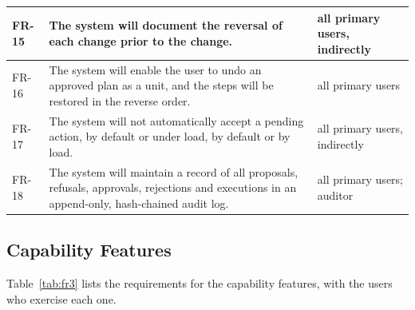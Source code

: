 \documentclass{FastFyp}
\begin{document}
{\begin{longtable}{|p{1.3cm}|p{9.8cm}|p{3.0cm}|}
\hline
FR-15 & The system will document the reversal of each change prior to the change. & all primary users, indirectly \\
\hline
FR-16 & The system will enable the user to undo an approved plan as a unit, and the steps will be restored in the reverse order. & all primary users \\
\hline
FR-17 & The system will not automatically accept a pending action, by default or under load, by default or by load. & all primary users, indirectly \\
\hline
FR-18 & The system will maintain a record of all proposals, refusals, approvals, rejections and executions in an append-only, hash-chained audit log. & all primary users; auditor \\
\hline
\end{longtable}
}

\subsection{Capability Features}
Table~\ref{tab:fr3} lists the requirements for the capability features, with the users who exercise each one.
\end{document}
